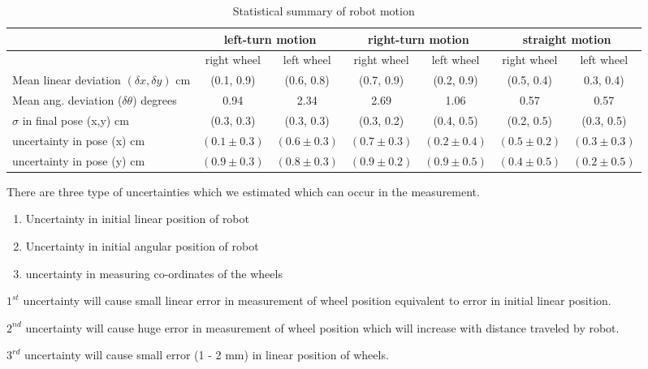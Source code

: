 \documentclass[11pt,a4paper,openright,twoside]{extreport}
\begin{document}
\begin{table}[ht]
	\centering
	\begin{tabular}{| l | c | c | c | c | c | c |}
		\hline
		& \multicolumn{2}{c|}{left-turn motion} & \multicolumn{2}{c|}{ right-turn motion} & \multicolumn{2}{c|}{straight motion} \\
		\hline
		& right wheel & left wheel & right wheel & left wheel & right wheel & left wheel \\
		\hline
		Mean linear deviation $(\delta x, \delta y)$ cm & (0.1, 0.9) & (0.6, 0.8)
		& (0.7, 0.9) & (0.2, 0.9) & (0.5, 0.4) & 0.3, 0.4) \\
		\hline
		Mean ang. deviation ($\delta \theta$) degrees & 0.94 & 2.34 & 2.69 & 1.06 & 0.57 & 0.57 \\
		\hline
		$\sigma$ in final pose (x,y) cm & (0.3, 0.3) & (0.3, 0.3) & (0.3, 0.2) & (0.4, 0.5) & (0.2, 0.5) & (0.3, 0.5)\\
		\hline
		uncertainty in pose (x) cm & $(0.1 \pm 0.3)$ & $(0.6 \pm 0.3)$ & $(0.7 \pm 0.3)$ & $(0.2 \pm 0.4)$ & $(0.5 \pm 0.2)$ & $(0.3 \pm 0.3)$ \\
		uncertainty in pose (y) cm & $(0.9 \pm 0.3)$ & $(0.8 \pm 0.3)$ & $(0.9 \pm 0.2)$ & $(0.9 \pm 0.5)$ & $(0.4 \pm 0.5)$ & $(0.2 \pm 0.5)$ \\
		\hline
	\end{tabular}
	\caption{Statistical summary of robot motion}
	\label{stats}
\end{table}
There are three type of uncertainties which we estimated which can occur in the measurement. 
\begin{enumerate}
	\item Uncertainty in initial linear position of robot
	\item Uncertainty in initial angular position of robot
	\item uncertainty in measuring co-ordinates of the wheels
\end{enumerate}   

$1^{st}$ uncertainty will cause small linear error in measurement of wheel position equivalent to error in initial linear position.

$2^{nd}$ uncertainty will cause huge error in measurement of wheel position which will increase with distance traveled by robot. 

$3^{rd}$ uncertainty will cause small error (1 - 2 mm) in linear position of wheels.
\end{document}

